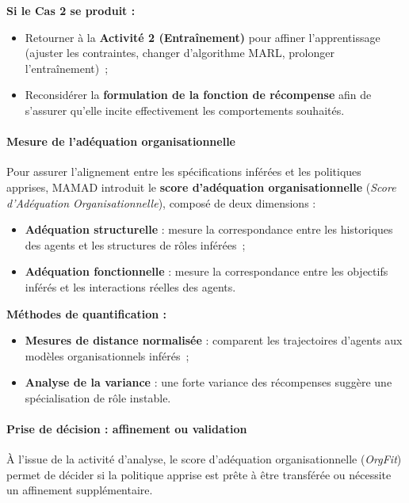 \vspace{0.4em}
\noindent \textbf{Si le Cas 2 se produit :}
\begin{itemize}
    \item Retourner à la \textbf{Activité 2 (Entraînement)} pour affiner l'apprentissage (ajuster les contraintes, changer d'algorithme MARL, prolonger l'entraînement)~;
    \item Reconsidérer la \textbf{formulation de la fonction de récompense} afin de s'assurer qu'elle incite effectivement les comportements souhaités.
\end{itemize}

\paragraph{Mesure de l'adéquation organisationnelle}

Pour assurer l'alignement entre les spécifications inférées et les politiques apprises, MAMAD introduit le \textbf{score d'adéquation organisationnelle} (\textit{Score d'Adéquation Organisationnelle}), composé de deux dimensions :

\begin{itemize}
    \item \textbf{Adéquation structurelle} : mesure la correspondance entre les historiques des agents et les structures de rôles inférées~;
    \item \textbf{Adéquation fonctionnelle} : mesure la correspondance entre les objectifs inférés et les interactions réelles des agents.
\end{itemize}

\vspace{0.4em}
\noindent \textbf{Méthodes de quantification :}
\begin{itemize}
    \item \textbf{Mesures de distance normalisée} : comparent les trajectoires d'agents aux modèles organisationnels inférés~;
    \item \textbf{Analyse de la variance} : une forte variance des récompenses suggère une spécialisation de rôle instable.
\end{itemize}

\paragraph{Prise de décision : affinement ou validation}

À l'issue de la activité d'analyse, le score d'adéquation organisationnelle (\textit{OrgFit}) permet de décider si la politique apprise est prête à être transférée ou nécessite un affinement supplémentaire.

